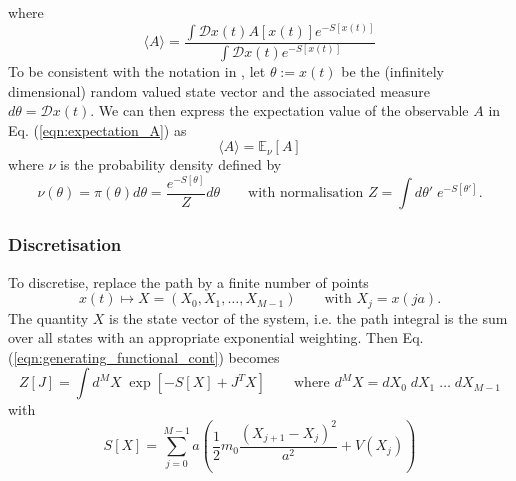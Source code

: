 \documentclass[11pt]{article}
\renewcommand{\vec}[1]{{#1}}
\begin{document}
where
\begin{equation}
  \langle A \rangle = \frac{\int \mathcal{D}x(t) A[x(t)] e^{-S[x(t)]}}{\int \mathcal{D}x(t) e^{-S[x(t)]}}\label{eqn:expectation_A}
\end{equation}
To be consistent with the notation in \cite{Dodwell2015}, let $\theta:=x(t)$ be the (infinitely dimensional) random valued state vector and the associated measure $d\theta=\mathcal{D}x(t)$. We can then express the expectation value of the observable $A$ in Eq. (\ref{eqn:expectation_A}) as
\begin{equation}
   \langle A \rangle = \mathbb{E}_{\nu}\left[A\right]
\end{equation}
where $\nu$ is the probability density defined by
\begin{equation}
  \nu(\theta) = \pi(\theta)d\theta=\frac{e^{-S[\theta]}}{Z}d\theta\qquad\text{with normalisation $Z = \int d\theta'\; e^{-S[\theta']}$}. 
\end{equation}
\subsubsection{Discretisation}
To discretise, replace the path by a finite number of points
\begin{equation}
  x(t) \mapsto \vec{X} = (X_0,X_1,\dots,X_{M-1})\qquad\text{with $X_j=x(ja)$}.
\end{equation}
The quantity $\vec{X}$ is the state vector of the system, i.e. the path integral is the sum over all states with an appropriate exponential weighting.
Then Eq. (\ref{eqn:generating_functional_cont}) becomes
\begin{equation}
  Z[\vec{J}] = \int d^M\vec{X} \;\exp\left[-S[\vec{X}]+\vec{J}^T \vec{X} \right]\qquad\text{where $d^M\vec{X}=dX_0\;dX_1\;\dots\;dX_{M-1}$}\label{eqn:generating_functional_disc}
\end{equation}
with
\begin{equation}
  S[\vec{X}] = \sum_{j=0}^{M-1} a \left(\frac{1}{2}m_0\frac{(X_{j+1}-X_j)^2}{a^2}+V(X_j)\right)\label{eqn:action}
\end{equation}
\end{document}
